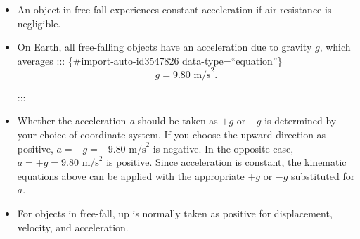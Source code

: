 \documentclass[
]{book}
\begin{document}
\begin{itemize}
\item
  \protect\hypertarget{import-auto-id1715211}{}{An object in free-fall experiences constant acceleration if air
  resistance is negligible.}
\item
  \protect\hypertarget{import-auto-id1715213}{}{On Earth, all free-falling objects have an acceleration due to
  gravity \(g{}\), which averages}
  ::: \{\#import-auto-id3547826 data-type=``equation''\}
  \[{{{g = 9}\text{.}\text{80\ m/s}^{2}}.}{}\]

  :::
\item
  \protect\hypertarget{import-auto-id2150922}{}{Whether the acceleration \emph{a} should be taken as \({+ g}{}\) or
  \({- g}{}\) is determined by your choice of coordinate system. If you
  choose the upward direction as positive,
  \({{a = {- g}} = {- 9}}\text{.}\text{80\ m}\text{/s}^{2}\) is
  negative. In the opposite case,
  \({a = {{+g} = 9}\text{.}\text{80\ m/s}^{2}}{}\) is positive. Since
  acceleration is constant, the kinematic equations above can be
  applied with the appropriate \({+ g}{}\) or \({- g}{}\) substituted for
  \(a{}\).}
\item
  \protect\hypertarget{import-auto-id4051701}{}{For objects in free-fall, up is normally taken as positive for
  displacement, velocity, and acceleration.}
\end{itemize}
\end{document}
